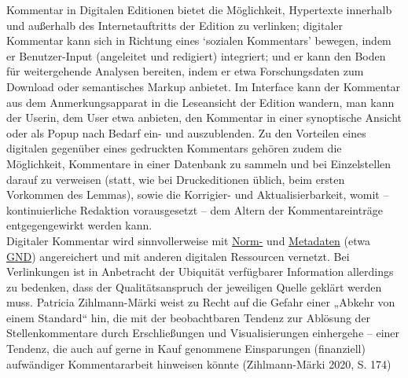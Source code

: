 \documentclass{article}
\begin{document}
        Kommentar in Digitalen Editionen bietet die Möglichkeit, Hypertexte innerhalb und
                  außerhalb des Internetauftritts der Edition zu verlinken; digitaler Kommentar kann
                  sich in Richtung eines ‘sozialen Kommentars’ bewegen, indem er Benutzer-Input
                  (angeleitet und redigiert) integriert; und er kann den Boden für weitergehende
                  Analysen bereiten, indem er etwa Forschungsdaten zum Download oder semantisches
                  Markup anbietet. Im Interface kann der Kommentar aus dem Anmerkungsapparat in die
                  Leseansicht der Edition wandern, man kann der Userin, dem User etwa anbieten, den
                  Kommentar in einer synoptische Ansicht oder als Popup nach Bedarf ein- und
                  auszublenden. Zu den Vorteilen eines digitalen gegenüber eines gedruckten
                  Kommentars gehören zudem die Möglichkeit, Kommentare in einer Datenbank zu sammeln
                  und bei Einzelstellen darauf zu verweisen (statt, wie bei Druckeditionen üblich,
                  beim ersten Vorkommen des Lemmas), sowie die Korrigier- und Aktualisierbarkeit,
                  womit – kontinuierliche Redaktion vorausgesetzt – dem Altern der Kommentareinträge
                  entgegengewirkt werden kann.\\
            
         Digitaler Kommentar wird sinnvollerweise mit \href{http://gams.uni-graz.at/o:konde.147}{Norm-} und \href{http://gams.uni-graz.at/o:konde.25}{Metadaten} (etwa \href{http://gams.uni-graz.at/o:konde.109}{GND})
                  angereichert und mit anderen digitalen Ressourcen vernetzt. Bei Verlinkungen ist
                  in Anbetracht der Ubiquität verfügbarer Information allerdings zu bedenken, dass
                  der Qualitätsanspruch der jeweiligen Quelle geklärt werden muss. Patricia
                  Zihlmann-Märki weist zu Recht auf die Gefahr einer „Abkehr von einem Standard“
                  hin, die mit der beobachtbaren Tendenz zur Ablösung der Stellenkommentare durch
                  Erschließungen und Visualisierungen einhergehe – einer Tendenz, die auch auf gerne
                  in Kauf genommene Einsparungen (finanziell) aufwändiger Kommentararbeit hinweisen
                  könnte (Zihlmann-Märki 2020, S. 174)\\
            
\end{document}
